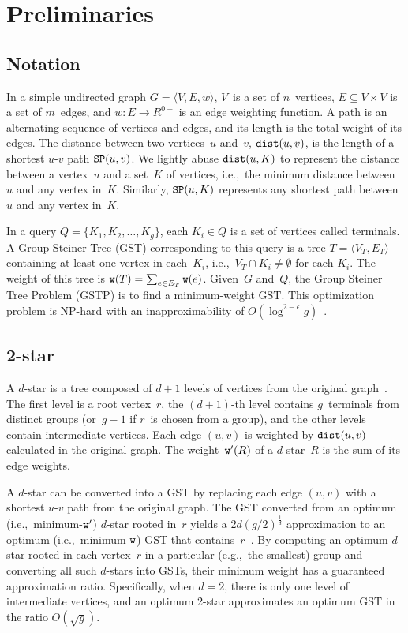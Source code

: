 \section{Preliminaries}
\label{sec: preliminaries}

\subsection{Notation}
\label{subsec: GST_def}

In a simple undirected graph $G = \langle V,E,w \rangle$, $V$~is a set of $n$~vertices, $E \subseteq V \times V$ is a set of $m$~edges, and $w: E \rightarrow R^{0+}$ is an edge weighting function.
A path is an alternating sequence of vertices and edges, and its length is the total weight of its edges. The distance between two vertices~$u$ and~$v$, $\mathtt{dist}(u,v)$, is the length of a shortest $u$-$v$ path $\mathtt{SP}(u,v)$. We lightly abuse $\mathtt{dist}(u,K)$ to represent the distance between a vertex~$u$ and a set~$K$ of vertices, i.e.,~the minimum distance between~$u$ and any vertex in~$K$. Similarly, $\mathtt{SP}(u,K)$ represents any shortest path between~$u$ and any vertex in~$K$.

In a query $Q = \{ K_1, K_2, \dots, K_g\}$, each $K_i \in Q$ is a set of vertices called terminals. A Group Steiner Tree (GST) corresponding to this query is a tree $T = \langle V_T,E_T \rangle$ containing at least one vertex in each~$K_i$, i.e.,~$V_T \cap K_i \neq \emptyset$ for each $K_i$. The weight of this tree is $\mathtt{w}(T) = \sum_{e \in E_T}{\mathtt{w}(e)}$. Given~$G$ and~$Q$, the Group Steiner Tree Problem (GSTP) is to find a minimum-weight GST. This optimization problem is NP-hard with an inapproximability of $O(\log^{2-\epsilon}{g})$~\cite{ProveInapproximability}.

\subsection{2-star}
\label{subsec: 2-star}

A $d$-star is a tree composed of $d+1$ levels of vertices from the original graph~\cite{dstar1, dstar2}. The first level is a root vertex~$r$, the $(d+1)$-th level contains $g$~terminals from distinct groups (or~$g-1$ if $r$~is chosen from a group), and the other levels contain intermediate vertices. Each edge $(u,v)$ is weighted by $\mathtt{dist}(u,v)$ calculated in the original graph. The weight~$\mathtt{w}'(R)$ of a $d$-star~$R$ is the sum of its edge weights.

A $d$-star can be converted into a GST by replacing each edge $(u,v)$ with a shortest $u$-$v$ path from the original graph. The GST converted from an optimum (i.e.,~minimum-$\mathtt{w}'$) $d$-star rooted in~$r$ yields a $2d(g/2)^{\frac{1}{d}}$ approximation to an optimum (i.e.,~minimum-$\mathtt{w}$) GST that contains~$r$~\cite{dstar2}. By computing an optimum $d$-star rooted in each vertex~$r$ in a particular (e.g.,~the smallest) group and converting all such $d$-stars into GSTs, their minimum weight has a guaranteed approximation ratio. Specifically, when $d=2$, there is only one level of intermediate vertices, and an optimum 2-star approximates an optimum GST in the ratio $O(\sqrt{g})$.

